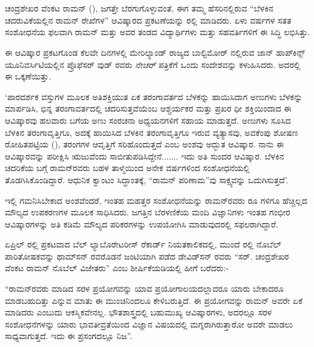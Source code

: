
\chapter{}


ಚಂದ್ರಶೇಖರ ವೆಂಕಟ ರಾಮನ್ (), ಜಗತ್ತೇ ಬೆರಗುಗೊಳ್ಳುವಂತೆ, ಈಗ ತಮ್ಮ ಹೆಸರಿನಲ್ಲಿರುವ “ಬೆಳಕಿನ ಚದರುವಿಕೆಯಲ್ಲಿನ ರಾಮನ್ ರೇಖೆಗಳ” ಆವಿಷ್ಕಾರದ ಪ್ರಕಟಣೆಯನ್ನು ರಲ್ಲಿ ಮಾಡಿದರು. ಏಳು ವರ್ಷಗಳ ಸತತ ಸಂಶೋಧನೆಯ ಫಲವಾಗಿ ರಾಮನ್ ಮತ್ತು ಅವರ ತಂಡದ ವಿದ್ಯಾರ್ಥಿಗಳು ಮತ್ತು ಸಹವರ್ತಿಗಳಿಗೆ ಈ ಸಿದ್ಧಿ ಲಭಿಸಿತ್ತು.

ಈ ಆವಿಷ್ಕಾರ ಪ್ರಕಟಗೊಂಡ ಕೆಲವೇ ದಿನಗಳಲ್ಲಿ ಮೇರಿಲ್ಯಾಂಡ್ ರಾಜ್ಯದ ಬಾಲ್ಟಿಮೋರ್ ನಲ್ಲಿರುವ ಜಾನ್ ಹಾಪ್‍ಕಿನ್ಸ್ ಯೂನಿವರ್ಸಿಟಿಯಲ್ಲಿನ ಪ್ರೊಫೆಸರ್  ವುಡ್ ರವರು \textit{ನೇಚರ್} ಪತ್ರಿಕೆಗೆ ಒಂದು ಸಂದೇಶವನ್ನು ಕಳುಹಿಸಿದರು. ಅದರಲ್ಲಿ ಈ ಒಕ್ಕಣೆಯಿತ್ತು.

‘ಪಾರದರ್ಶಕ ವಸ್ತುಗಳ ಮೂಲಕ ಅತಿಶಕ್ತಿಯುತ ಏಕ ತರಂಗಾವರ್ತದ ಬೆಳಕನ್ನು ಹಾಯಿಸಿದಾಗ ಅಣುಗಳು ಬೆಳಕನ್ನು ಮಾರ್ಪಡಿಸಿ, ಭಿನ್ನ ತರಂಗಾವರ್ತದಲ್ಲಿ ಚದರಿಸುತ್ತವೆಯೆಂಬ ಆಶ್ಚರ್ಯಕರ ಮತ್ತು ಪ್ರಖರ ಧೀ ಶಕ್ತಿಯಿಂದಾದ ಈ ಆವಿಷ್ಕಾರವು ಹಲವಾರು ಬಗೆಯ ಅಣು ಸಂರಚನಾ ಅಧ್ಯಯನಗಳಿಗೆ ಸಹಾಯ ಮಾಡುತ್ತದೆ. ಅಣುಗಳು ಸೂಸಿದ ಬೆಳಕಿನ ತರಂಗಾವೃತ್ತಿಗೂ, ಅದಕ್ಕೆ ಹಾಯಿಸಿದ ಬೆಳಕಿನ ತರಂಗಾವೃತ್ತಿಗೂ ಇರುವ ವ್ಯತ್ಯಾಸವು, ಅವಕೆಂಪು ಶೋಷಣ ರೋಹಿತಪಟ್ಟಿಯ (), ತರಂಗಗಳ ಆವೃತ್ತಿಗೆ ಸರಿಹೊಂದುತ್ತದೆ ಎಂಬ ಅಂಶವು ಅದ್ಭುತ ಆವಿಷ್ಕಾರ. ನಾನು ಈ ಆವಿಷ್ಕಾರವನ್ನು ಪರೀಕ್ಷಿಸಿ ಋಜುವೆಂದು ಸಾಬೀತುಪಡಿಸಿದ್ದೇನೆ....... ಇದು ಅತಿ ಸುಂದರ ಆವಿಷ್ಕಾರ. ಬೆಳಕಿನ ಚದರಿಕೆಯ ಬಗ್ಗೆ ರಾಮನ್‍ರವರು ಬಹಳ ತಾಳ್ಮೆಯಿಂದ ಅನೇಕ ವರ್ಷಗಳಿಂದ ಸಂಶೋಧನೆಯಲ್ಲಿ ತೊಡಗಿಸಿಕೊಂಡಿದ್ದಾರೆ. ಆಧುನಿಕ ಕ್ವಾಂಟಂ ಸಿದ್ಧಾಂತಕ್ಕೆ, “ರಾಮನ್ ಪರಿಣಾಮ”ವು ಸಾಕ್ಷ್ಯವನ್ನು ಒದುಗಿಸುತ್ತದೆ’.

ಇಲ್ಲಿ ಗಮನಿಸಿಬೇಕಾದ ಅಂಶವೆಂದರೆ, ಇಂತಹ ಮಹತ್ತರ ಸಂಶೋಧನೆಯನ್ನು ರಾಮನ್‍ರವರು  ರೂ ಗಳಿಗೂ ಹೆಚ್ಚಿಲ್ಲದ ಮೌಲ್ಯದ ಉಪಕರಣಗಳ ಮೂಲಕ ಸಾಧಿಸಿದರು. ಜಗತ್ತಿನ ಬೆರಳಣಿಕೆಯ ಮಂದಿ ವಿಜ್ಞಾನಿಗಳು ಇಂತಹ ಗಂಭೀರ ಆವಿಷ್ಕಾರಗಳನ್ನು ಅತಿ ಕಡಿಮೆ ಮೌಲ್ಯದ ಪರಿಕರಗಳನ್ನು ಉಪಯೋಗಿಸಿ ಮಾಡುವುದರಲ್ಲಿ ಸಫಲರಾಗಿದ್ದಾರೆ.

ಏಪ್ರಿಲ್ ರಲ್ಲಿ ಪ್ರಕಟವಾದ ಬೆಲ್ ಲ್ಯಾಬೊರೇಟರೀಸ್ ರೆಕಾರ್ಡ್ ನಿಯತಕಾಲಿಕದಲ್ಲಿ, ಮುಂದೆ ರಲ್ಲಿ ನೊಬೆಲ್ ಪಾರಿತೋಷಕವನ್ನು  ಥಾಮ್‍ಸನ್ ರವರೊಡನೆ ಜಂಟಿಯಾಗಿ ಪಡೆದ  ಡೇವಿಡ್‍ಸನ್ ರವರು “ಸರ್. ಚಂದ್ರಶೇಖರ ವೆಂಕಟ ರಾಮನ್ ನೊಬೆಲ್ ವಿಜೇತರು” ಎಂಬ ಶೀರ್ಷಿಕೆಯಡಿಯಲ್ಲಿ ಹೀಗೆ ಬರೆದರು:-

“ರಾಮನ್‍ರವರು ಮಾಡಿದ ಸರಳ ಪ್ರಯೋಗವನ್ನು ಯಾವ ಪ್ರಯೋಗಾಲಯದಲ್ಲಾದರೂ ಯಾರು ಬೇಕಾದರೂ ಮಾಡಬಹುದಿತ್ತು ಎನ್ನುವ ಮಾತು ಈ ಮುಂಚಿನಿಂದಲೂ ಕೇಳಿಬರುತ್ತಿದೆ. ಈ ಪ್ರಯೋಗವನ್ನು ರಾಮನ್ ಅವರೇ ಏಕೆ ಮಾಡಿದರು ಎಂಬುದು ಆಕಸ್ಮಿಕವೇನಲ್ಲ. ಭೌತಶಾಸ್ತ್ರದಲ್ಲಿ ಬಹುಮುಖ್ಯ ಆವಿಷ್ಕಾರಗಳು, ಅದರಲ್ಲೂ ಸರಳ ಸಂಶೋಧನೆಗಳನ್ನು ಯಾರು ಭಾವತೀವ್ರತೆಯಿಂದ ವಿಜ್ಞಾನ ವಿಷಯದಲ್ಲಿ ಮಗ್ನರಾಗಿರುತ್ತಾರೋ ಅವರೇ ಮಾಡಲು ಸಾಧ್ಯವಾಗುತ್ತದೆ. ಇದು ಈ ಪ್ರಸಂಗದಲ್ಲೂ ನಿಜ”.

